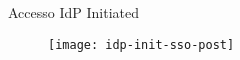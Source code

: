 \begin{frame}[t,noframenumbering]{Accesso IdP Initiated}
\vspace{0.2cm}
\begin{figure}[h]
\centering
\texttt{[image: idp-init-sso-post]}
\end{figure}
\end{frame}